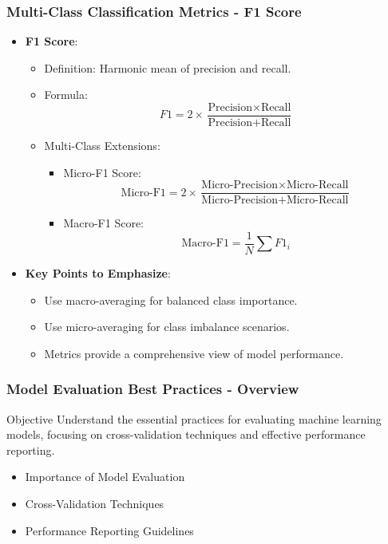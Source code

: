 \documentclass{beamer}
\begin{document}
\begin{frame}[fragile]
    \frametitle{Multi-Class Classification Metrics - F1 Score}
    \begin{itemize}
        \item \textbf{F1 Score}:
        \begin{itemize}
            \item Definition: Harmonic mean of precision and recall.
            \item Formula:
            \begin{equation} 
                F1 = 2 \times \frac{\text{Precision} \times \text{Recall}}{\text{Precision} + \text{Recall}} 
            \end{equation}
            \item Multi-Class Extensions:
            \begin{itemize}
                \item Micro-F1 Score:
                \begin{equation} 
                    \text{Micro-F1} = 2 \times \frac{\text{Micro-Precision} \times \text{Micro-Recall}}{\text{Micro-Precision} + \text{Micro-Recall}} 
                \end{equation}
                \item Macro-F1 Score:
                \begin{equation} 
                    \text{Macro-F1} = \frac{1}{N} \sum F1_i 
                \end{equation}
            \end{itemize}
        \end{itemize}
        
        \item \textbf{Key Points to Emphasize}:
        \begin{itemize}
            \item Use macro-averaging for balanced class importance.
            \item Use micro-averaging for class imbalance scenarios.
            \item Metrics provide a comprehensive view of model performance.
        \end{itemize}
    \end{itemize}
\end{frame}

\begin{frame}[fragile]
    \frametitle{Model Evaluation Best Practices - Overview}
    \begin{block}{Objective}
        Understand the essential practices for evaluating machine learning models, focusing on cross-validation techniques and effective performance reporting.
    \end{block}
    
    \begin{itemize}
        \item Importance of Model Evaluation
        \item Cross-Validation Techniques
        \item Performance Reporting Guidelines
    \end{itemize}
\end{frame}
\end{document}
